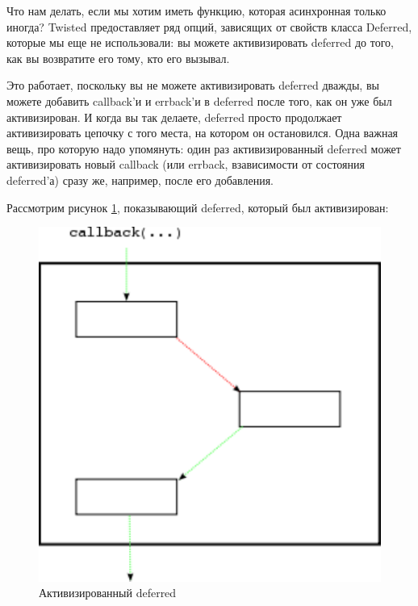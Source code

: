Что нам делать, если мы хотим иметь функцию, которая 
асинхронная только иногда? Twisted предоставляет ряд 
опций, зависящих от свойств класса Deferred, 
которые мы еще не использовали: вы можете активизировать 
deferred до того, как вы возвратите его тому, кто его вызывал. 


Это работает, поскольку вы не можете активизировать 
deferred дважды, вы можете добавить callback'и и 
errback'и в deferred после того, как он уже был активизирован. 
И когда вы так делаете, deferred просто продолжает 
активизировать цепочку с того места, на котором он остановился. 
Одна важная вещь, про которую надо упомянуть: один раз 
активизированный deferred может активизировать новый callback (или 
errback, взависимости от состояния deferred'а) сразу же, например, 
после его добавления. 

Рассмотрим рисунок \ref{fig:deferred-13}, показывающий deferred, 
который был активизирован:

\begin{figure}[h]
\begin{center}
\includegraphics[height=0.3\textheight]{images/deferred-13.pdf} 
\caption{Активизированный deferred}\label{fig:deferred-13}
\end{center}
\end{figure}

